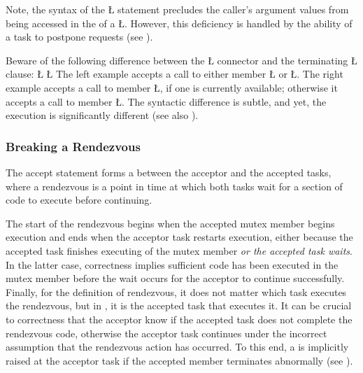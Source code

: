 \documentclass[openright,twoside]{report}
\begin{document}
\begin{annotation}
Note, the syntax of the \LGinlinetrue\LGbegin\lgrinde\L{}\endlgrinde\LGend{} statement precludes the caller's argument values from being accessed in the  of a \LGinlinetrue\LGbegin\lgrinde\L{}\endlgrinde\LGend{}.
However, this deficiency is handled by the ability of a task to postpone requests (see ).
\end{annotation}

\begin{annotation}
 Beware of the following difference between the \LGinlinetrue\LGbegin\lgrinde\L{}\endlgrinde\LGend{} connector and the terminating \LGinlinetrue\LGbegin\lgrinde\L{}\endlgrinde\LGend{} clause:
\LGinlinefalse\LGbegin\lgrinde
\L{}
\L{}
\endlgrinde\LGend
The left example accepts a call to either member \LGinlinetrue\LGbegin\lgrinde\L{}\endlgrinde\LGend{} or \LGinlinetrue\LGbegin\lgrinde\L{}\endlgrinde\LGend{}.
The right example accepts a call to member \LGinlinetrue\LGbegin\lgrinde\L{}\endlgrinde\LGend{}, if one is currently available;
otherwise it accepts a call to member \LGinlinetrue\LGbegin\lgrinde\L{}\endlgrinde\LGend{}.
The syntactic difference is subtle, and yet, the execution is significantly different (see also ).
\end{annotation}


\subsubsection{Breaking a Rendezvous}
\label{s:BreakingRendezvous1}

The accept statement forms a  between the acceptor and the accepted tasks, where a rendezvous is a point in time at which both tasks wait for a section of code to execute before continuing.
\begin{center}

\end{center}
The start of the rendezvous begins when the accepted mutex member begins execution and ends when the acceptor task restarts execution, either because the accepted task finishes executing of the mutex member \emph{or the accepted task waits}.
In the latter case, correctness implies sufficient code has been executed in the mutex member before the wait occurs for the acceptor to continue successfully.
Finally, for the definition of rendezvous, it does not matter which task executes the rendezvous, but in \uC, it is the accepted task that executes it.
It can be crucial to correctness that the acceptor know if the accepted task does not complete the rendezvous code, otherwise the acceptor task continues under the incorrect assumption that the rendezvous action has occurred.
To this end, a  is implicitly raised at the acceptor task if the accepted member terminates abnormally (see ).
\end{document}
